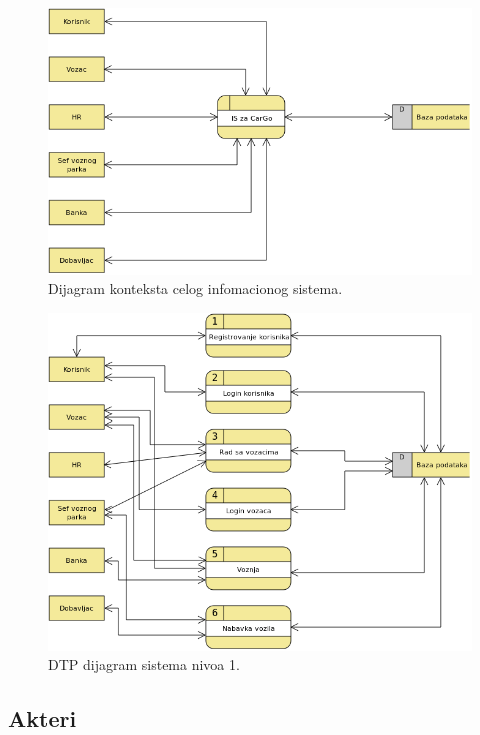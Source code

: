 \documentclass{article}
\begin{document}
\begin{figure}[H]
\begin{center}
\includegraphics[width=\textwidth]{CarGoContextDiagram.png}
\end{center}
    \caption{Dijagram konteksta celog infomacionog sistema.}
\label{fig:contextDiagram}
\end{figure}

\begin{figure}[H]
\begin{center}
\includegraphics[width=\textwidth]{ISzaCarGo.png}
\end{center}
    \caption{DTP dijagram sistema nivoa 1.}
\label{fig:dtp1}
\end{figure}

\subsection{\bfseries Akteri}
\end{document}
